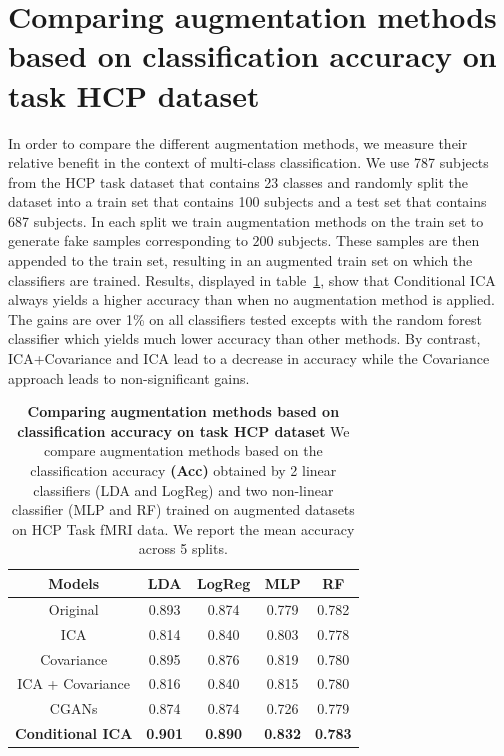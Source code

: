  
\section{Comparing augmentation methods based on classification accuracy on task
  HCP dataset}
In order to compare the different augmentation methods, we measure their 
relative benefit in the context of multi-class classification.
We use 787 subjects from the HCP task dataset that contains 23 classes and
randomly split the dataset into a train set that contains 100 subjects and a test set
that contains 687 subjects. In each split we train augmentation methods on the
train set to generate fake samples corresponding to $200$ subjects.  
These samples are then appended to the train set, resulting in an
augmented train set on which the classifiers are trained. Results, displayed in
table~\ref{condica:tab3}, show that Conditional ICA always yields a higher accuracy
than when no augmentation method is applied. The gains are over 1\% on all
classifiers tested excepts with the random forest classifier which yields much
lower accuracy than other methods.
%
By contrast, ICA+Covariance and ICA lead to a decrease in accuracy
while the Covariance approach leads to non-significant
gains.
%

\begin{table}
  \setlength{\tabcolsep}{0.23em}
  \begin{center}
    \begin{tabular}{c|c|c|c | c}
      \hline
      Models & LDA & LogReg & MLP& RF\\
      \hline
      Original           & 0.893 & 0.874 &  0.779 &0.782 \\
    ICA                & 0.814 & 0.840 &  0.803 &0.778\\
    Covariance         & 0.895 & 0.876 &  0.819 &0.780\\
    ICA + Covariance   & 0.816 & 0.840 &  0.815 &0.780\\
    CGANs              & 0.874 & 0.874 &   0.726&0.779 \\
    \hline                                      
      \textbf{Conditional ICA} &  \textbf{0.901} & \textbf{0.890} & \textbf{0.832} &  \textbf{0.783} \\
    \hline\hline
\end{tabular}
\end{center}
\caption{\textbf{Comparing augmentation methods based on classification accuracy on task
      HCP dataset} We compare augmentation methods based on the classification
    accuracy \textbf{(Acc)} obtained by 2 linear classifiers (LDA and LogReg) and two
    non-linear classifier (MLP and RF) trained on augmented datasets on HCP
    Task fMRI data. We report the mean accuracy across 5 splits.}
  \label{condica:tab3}
\end{table}

